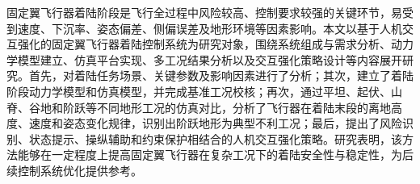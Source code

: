 
\begin{abstractzh}

固定翼飞行器着陆阶段是飞行全过程中风险较高、控制要求较强的关键环节，易受到速度、下沉率、姿态偏差、侧偏误差及地形环境等因素影响。本文以基于人机交互强化的固定翼飞行器着陆控制系统为研究对象，围绕系统组成与需求分析、动力学模型建立、仿真平台实现、多工况结果分析以及交互强化策略设计等内容展开研究。首先，对着陆任务场景、关键参数及影响因素进行了分析；其次，建立了着陆阶段动力学模型和仿真模型，并完成基准工况校核；再次，通过平坦、起伏、山脊、谷地和阶跃等不同地形工况的仿真对比，分析了飞行器在着陆末段的离地高度、速度和姿态变化规律，识别出阶跃地形为典型不利工况；最后，提出了风险识别、状态提示、操纵辅助和约束保护相结合的人机交互强化策略。研究表明，该方法能够在一定程度上提高固定翼飞行器在复杂工况下的着陆安全性与稳定性，为后续控制系统优化提供参考。

\end{abstractzh}
